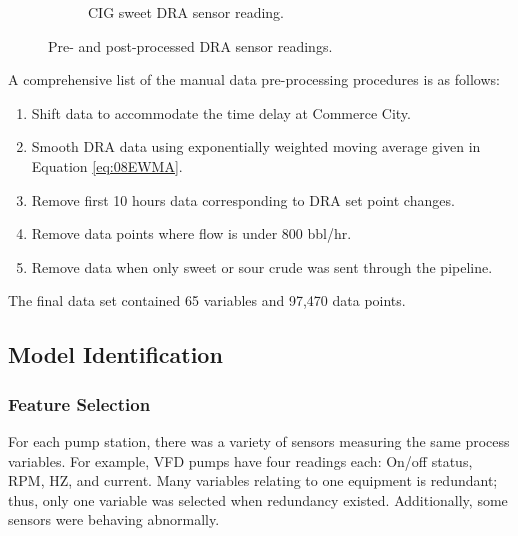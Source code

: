 \begin{figure}
\begin{subfigure}[b]{0.9\textwidth}
         \caption{CIG sweet DRA sensor reading.}
         \label{fig:08AultSweet}
     \end{subfigure}
        \caption{Pre- and post-processed DRA sensor readings.}
        \label{fig:08DRA}
\end{figure}

A comprehensive list of the manual data pre-processing procedures is as follows:
\begin{enumerate}
    \item Shift data to accommodate the time delay at Commerce City.
    \item Smooth DRA data using exponentially weighted moving average given in Equation \ref{eq:08EWMA}.  
    \item Remove first 10 hours data corresponding to DRA set point changes.
    \item Remove data points where flow is under 800 bbl/hr.
    \item Remove data when only sweet or sour crude was sent through the pipeline.
\end{enumerate}

The final data set contained 65 variables and 97,470 data points.

\subsection{Model Identification}
\subsubsection{Feature Selection}
For each pump station, there was a variety of sensors measuring the same process variables.  For example, VFD pumps have four readings each: On/off status, RPM, HZ, and current. Many variables relating to one equipment is redundant; thus, only one variable was selected when redundancy existed. Additionally, some sensors were behaving abnormally.

